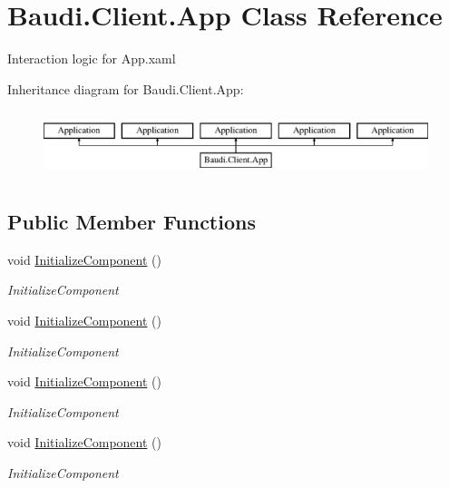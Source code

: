\hypertarget{class_baudi_1_1_client_1_1_app}{}\section{Baudi.\+Client.\+App Class Reference}
\label{class_baudi_1_1_client_1_1_app}


Interaction logic for App.\+xaml  


Inheritance diagram for Baudi.\+Client.\+App\+:\begin{figure}[H]
\begin{center}
\leavevmode
\includegraphics[height=1.947826cm]{class_baudi_1_1_client_1_1_app}
\end{center}
\end{figure}
\subsection*{Public Member Functions}
\begin{DoxyCompactItemize}
\item 
void \hyperlink{class_baudi_1_1_client_1_1_app_aab989d31aab36ccb13a1e88dbe4add28}{Initialize\+Component} ()
\begin{DoxyCompactList}\small\item\em Initialize\+Component \end{DoxyCompactList}\item 
void \hyperlink{class_baudi_1_1_client_1_1_app_aab989d31aab36ccb13a1e88dbe4add28}{Initialize\+Component} ()
\begin{DoxyCompactList}\small\item\em Initialize\+Component \end{DoxyCompactList}\item 
void \hyperlink{class_baudi_1_1_client_1_1_app_aab989d31aab36ccb13a1e88dbe4add28}{Initialize\+Component} ()
\begin{DoxyCompactList}\small\item\em Initialize\+Component \end{DoxyCompactList}\item 
void \hyperlink{class_baudi_1_1_client_1_1_app_aab989d31aab36ccb13a1e88dbe4add28}{Initialize\+Component} ()
\begin{DoxyCompactList}\small\item\em Initialize\+Component \end{DoxyCompactList}\end{DoxyCompactItemize}
